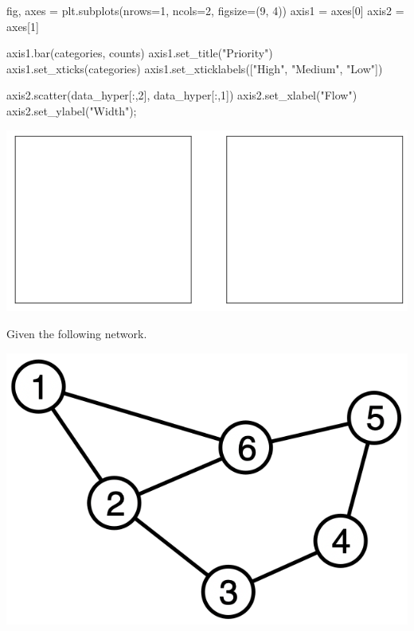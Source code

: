 \documentclass[addpoints,a4]{exam} %
\begin{document}
\begin{questions}
\begin{python}
fig, axes = plt.subplots(nrows=1, ncols=2, figsize=(9, 4))
axis1 = axes[0] 
axis2 = axes[1]

axis1.bar(categories, counts)
axis1.set_title("Priority")
axis1.set_xticks(categories)
axis1.set_xticklabels(["High", "Medium", "Low"])

axis2.scatter(data_hyper[:,2], data_hyper[:,1])
axis2.set_xlabel("Flow")
axis2.set_ylabel("Width");
\end{python}

\vspace{25px}
\begin{center}
\includegraphics[width=0.98\columnwidth]{box.png} %
\end{center}





\clearpage
{} Given the following network. 
\begin{center}
\includegraphics[width=0.30\columnwidth]{network.png} %
\end{center}

\end{questions}
\end{document}

